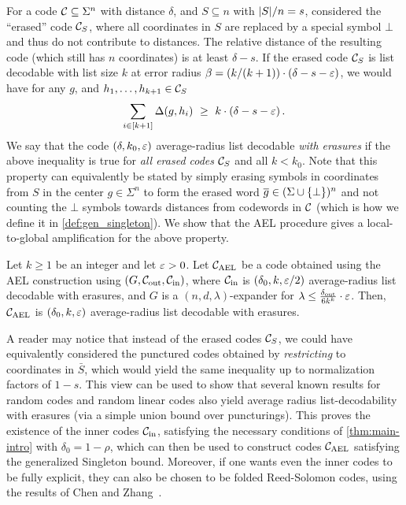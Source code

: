 For a code ${\mathcal C} \subseteq \Sigma^n$ with distance $\delta$, and $S \subseteq n$ with $\lvert S\rvert/n = s$, considered the ``erased'' code ${\mathcal C}_S$, where all coordinates in $S$ are replaced by a special symbol $\bot$ and thus do not contribute to distances. The relative distance of the resulting code (which still has $n$ coordinates) is at least $\delta - s$. 
%
If the erased code ${\mathcal C}_S$ is list decodable with list size $k$ at error radius $\beta = (k/(k+1)) \cdot (\delta - s - \varepsilon)$, we would have for any $g$, and $h_1, \ldots, h_{k+1} \in {\mathcal C}_S$
\[
\sum_{i \in [k+1]} \Delta(g,h_i) ~\geq~ k \cdot (\delta - s - \varepsilon) \,.
\]
%
We say that the code $(\delta, k_0, \varepsilon)$ average-radius list decodable \emph{with erasures} if the above inequality is true for \emph{all erased codes} ${\mathcal C}_S$ and all $k < k_0$. 
%
Note that this property can equivalently be stated by simply erasing symbols in coordinates from $S$ in the center $g \in \Sigma^n$ to form the erased word $\overline{g} \in (\Sigma \cup \{\bot\})^n$ and not counting the $\bot$ symbols towards distances from codewords in ${\mathcal C}$ (which is how we define it in \cref{def:gen_singleton}). 
%
We show that the AEL procedure gives a local-to-global amplification for the above property.
%
\begin{theorem}\label{thm:main-intro}
%
Let $k\geq 1$ be an integer and let $\varepsilon > 0$. Let ${ {\mathcal C}_{\mathrm{AEL}} }$ be a
code obtained using the AEL construction using  $(G, {\mathcal C}_{\mathrm{out}}, {\mathcal C}_{\mathrm{in}})$, where ${\mathcal C}_{\mathrm{in}}$ is $(\delta_0, k, \varepsilon/2)$ average-radius list decodable with erasures, and $G$ is a $(n,d,\lambda)$-expander for $\lambda \leq \frac{\delta_{\mathrm{out}}}{6{k}^{k}} \cdot \varepsilon$. 
%
Then, ${ {\mathcal C}_{\mathrm{AEL}} }$ is $(\delta_{0}, k,\varepsilon)$ average-radius list decodable with erasures.
\end{theorem}
%
A reader may notice that instead of the erased codes ${\mathcal C}_S$, we could have equivalently considered the punctured codes obtained by \emph{restricting} to coordinates in $\bar{S}$, which would yield the same inequality up to normalization factors of $1-s$. 
%
This view can be used to show that several known results for random codes and random linear codes also yield average radius list-decodability with erasures (via a simple union bound over puncturings). 
%
This proves the existence of the inner codes ${\mathcal C}_{\mathrm{in}}$, satisfying the necessary conditions of \cref{thm:main-intro} with $\delta_0 = 1 - \rho$, which can then be used to construct codes ${ {\mathcal C}_{\mathrm{AEL}} }$ satisfying the generalized Singleton bound. 
%
Moreover, if one wants even the inner codes to be fully explicit, they can also be chosen to be folded Reed-Solomon codes, using the results of Chen and Zhang~\cite{CZ24}.
